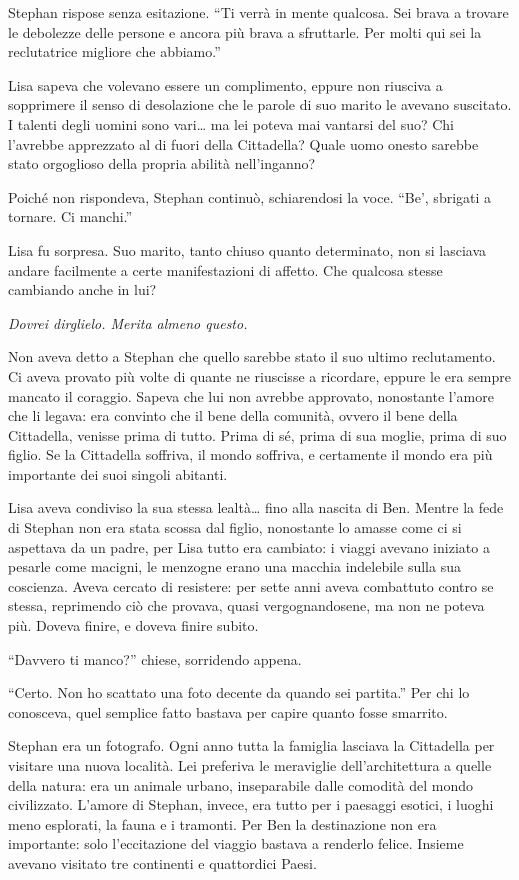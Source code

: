 \documentclass[a4paper,oneside,11pt]{memoir}
\begin{document}
Stephan rispose senza esitazione. ``Ti verrà in mente qualcosa. Sei brava a
trovare le debolezze delle persone e ancora più brava a sfruttarle. Per molti
qui sei la reclutatrice migliore che abbiamo.''

Lisa sapeva che volevano essere un complimento, eppure non riusciva a sopprimere
il senso di desolazione che le parole di suo marito le avevano suscitato. I
talenti degli uomini sono vari\dots{} ma lei poteva mai vantarsi del suo? Chi
l'avrebbe apprezzato al di fuori della Cittadella? Quale uomo onesto sarebbe
stato orgoglioso della propria abilità nell'inganno?

Poiché non rispondeva, Stephan continuò, schiarendosi la voce. ``Be', sbrigati
a tornare. Ci manchi.''

Lisa fu sorpresa. Suo marito, tanto chiuso quanto determinato, non si lasciava
andare facilmente a certe manifestazioni di affetto. Che qualcosa stesse
cambiando anche in lui?

\emph{Dovrei dirglielo. Merita almeno questo.}

Non aveva detto a Stephan che quello sarebbe stato il suo ultimo reclutamento.
Ci aveva provato più volte di quante ne riuscisse a ricordare, eppure le era
sempre mancato il coraggio. Sapeva che lui non avrebbe approvato, nonostante
l'amore che li legava: era convinto che il bene della comunità, ovvero il bene
della Cittadella, venisse prima di tutto. Prima di sé, prima di sua moglie,
prima di suo figlio. Se la Cittadella soffriva, il mondo soffriva, e
certamente il mondo era più importante dei suoi singoli abitanti.

Lisa aveva condiviso la sua stessa lealtà\dots{} fino alla nascita di Ben.
Mentre la fede di Stephan non era stata scossa dal figlio, nonostante lo
amasse come ci si aspettava da un padre, per Lisa tutto era cambiato: i viaggi
avevano iniziato a pesarle come macigni, le menzogne erano una macchia
indelebile sulla sua coscienza. Aveva cercato di resistere: per sette anni
aveva combattuto contro se stessa, reprimendo ciò che provava, quasi
vergognandosene, ma non ne poteva più. Doveva finire, e doveva finire subito.

``Davvero ti manco?'' chiese, sorridendo appena.

``Certo. Non ho scattato una foto decente da quando sei partita.'' Per chi lo
conosceva, quel semplice fatto bastava per capire quanto fosse smarrito.

Stephan era un fotografo. Ogni anno tutta la famiglia lasciava la Cittadella per
visitare una nuova località. Lei preferiva le meraviglie dell'architettura a
quelle della natura: era un animale urbano, inseparabile dalle comodità del
mondo civilizzato. L'amore di Stephan, invece, era tutto per i paesaggi esotici,
i luoghi meno esplorati, la fauna e i tramonti. Per Ben la destinazione non era
importante: solo l'eccitazione del viaggio bastava a renderlo felice. Insieme
avevano visitato tre continenti e quattordici Paesi.
\end{document}

